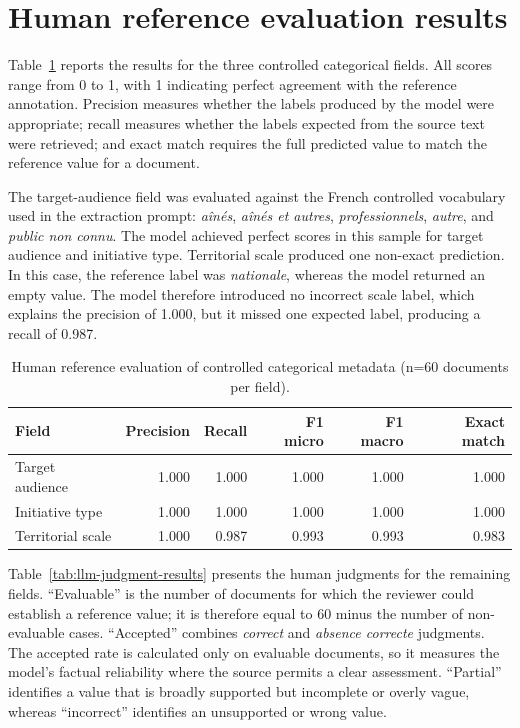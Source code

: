 \section{Human reference evaluation results}

Table~\ref{tab:llm-categorical-results} reports the results for the three
controlled categorical fields. All scores range from 0 to 1, with 1 indicating
perfect agreement with the reference annotation. Precision measures whether the
labels produced by the model were appropriate; recall measures whether the labels
expected from the source text were retrieved; and exact match requires the full
predicted value to match the reference value for a document.

The target-audience field was evaluated against the French controlled vocabulary
used in the extraction prompt: \textit{aînés}, \textit{aînés et autres},
\textit{professionnels}, \textit{autre}, and \textit{public non connu}. The model
achieved perfect scores in this sample for target audience and initiative type.
Territorial scale produced one non-exact prediction. In this case, the reference
label was \textit{nationale}, whereas the model returned an empty value. The model
therefore introduced no incorrect scale label, which explains the
precision of 1.000, but it missed one expected label, producing a recall of 0.987.

\begin{table}[H]
\centering
\begin{tabular}{lrrrrr}
\toprule
Field & Precision & Recall & F1 micro & F1 macro & Exact match \\
\midrule
Target audience & 1.000 & 1.000 & 1.000 & 1.000 & 1.000 \\
Initiative type & 1.000 & 1.000 & 1.000 & 1.000 & 1.000 \\
Territorial scale & 1.000 & 0.987 & 0.993 & 0.993 & 0.983 \\
\bottomrule
\end{tabular}
\caption{Human reference evaluation of controlled categorical metadata
(n=60 documents per field).}
\label{tab:llm-categorical-results}
\end{table}

Table~\ref{tab:llm-judgment-results} presents the human judgments for the
remaining fields. ``Evaluable'' is the number of documents for which the reviewer
could establish a reference value; it is therefore equal to 60 minus the number of
non-evaluable cases. ``Accepted'' combines \textit{correct} and \textit{absence
correcte} judgments. The accepted rate is calculated only on evaluable documents,
so it measures the model's factual reliability where the source permits a clear
assessment. ``Partial'' identifies a value that is broadly supported but incomplete
or overly vague, whereas ``incorrect'' identifies an unsupported or wrong value.


